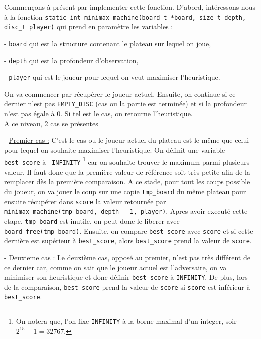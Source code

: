 \documentclass{report}
\begin{document}
Commençons à présent par implementer cette fonction. D'abord, intéressons nous à la fonction \texttt{static int minimax\_machine(board\_t *board, size\_t depth, disc\_t player)} qui prend en paramètre les variables :

- \texttt{board} qui est la structure contenant le plateau sur lequel on joue,

- \texttt{depth} qui est la profondeur d'observation,

- \texttt{player} qui est le joueur pour lequel on veut maximiser l'heuristique.

On va commencer par récupérer le joueur actuel. Ensuite, on continue si ce dernier n'est pas \texttt{EMPTY\_DISC} (cas ou la partie est terminée) et si la profondeur n'est pas égale à 0. Si tel est le cas, on retourne l'heuristique.
\\A ce niveau, 2 cas se présentes \newline

- \underline{Premier cas :}
C'est le cas ou le joueur actuel du plateau est le même que celui pour lequel on souhaite maximiser l'heuristique.
On définit une variable \texttt{best\_score} à \texttt{-INFINITY} \footnote{On notera que, l'on fixe \texttt{INFINITY} à la borne maximal d'un integer, soir $2^{15}-1 = 32767 $.} car on souhaite trouver le maximum parmi plusieurs valeur. Il faut donc que la première valeur de référence soit très petite afin de la remplacer dès la première comparaison.
A ce stade, pour tout les coups possible du joueur, on va jouer le coup sur une copie \texttt{tmp\_board} du même plateau pour ensuite récupérer dans \texttt{score} la valeur retournée par \texttt{minimax\_machine(tmp\_board, depth - 1, player)}. Apres avoir executé cette etape, \texttt{tmp\_board} est inutile, on peut donc le liberer avec \texttt{board\_free(tmp\_board)}.
Ensuite, on compare \texttt{best\_score} avec \texttt{score} et si cette dernière est supérieur à \texttt{best\_score}, alors \texttt{best\_score} prend la valeur de \texttt{score}.\newline

- \underline{Deuxieme cas :}
Le deuxième cas, opposé au premier, n'est pas très différent de ce dernier car, comme on sait que le joueur actuel est l'adversaire, on va minimiser son heuristique et donc définir \texttt{best\_score} à \texttt{INFINITY}. De plus, lors de la comparaison, \texttt{best\_score} prend la valeur de \texttt{score} si \texttt{score} est inférieur à \texttt{best\_score}.\newline
\end{document}
